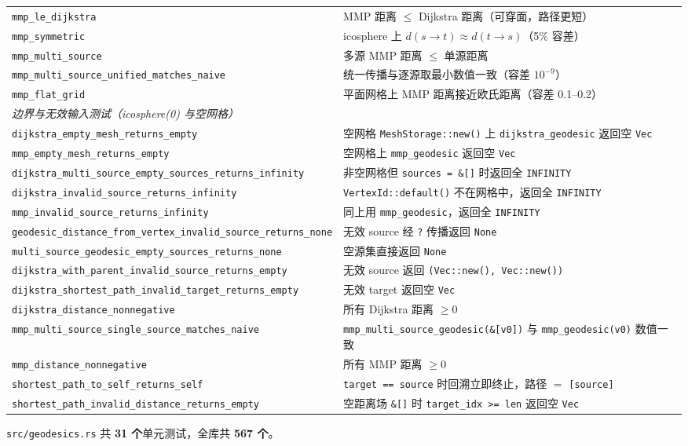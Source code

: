 \documentclass[11pt,a4paper]{article}
\begin{document}
{\begin{longtable}{@{}p{5.6cm}p{9.6cm}@{}}
  \texttt{mmp\_le\_dijkstra}
    & MMP 距离 $\le$ Dijkstra 距离（可穿面，路径更短） \\
  \texttt{mmp\_symmetric}
    & icosphere 上 $d(s \to t) \approx d(t \to s)$（5\% 容差） \\
  \texttt{mmp\_multi\_source}
    & 多源 MMP 距离 $\le$ 单源距离 \\
  \texttt{mmp\_multi\_source\_unified\_matches\_naive}
    & 统一传播与逐源取最小数值一致（容差 $10^{-9}$） \\
  \texttt{mmp\_flat\_grid}
    & 平面网格上 MMP 距离接近欧氏距离（容差 0.1--0.2） \\
  \midrule
  \multicolumn{2}{l}{\textit{边界与无效输入测试（icosphere(0) 与空网格）}} \\
  \texttt{dijkstra\_empty\_mesh\_returns\_empty}
    & 空网格 \texttt{MeshStorage::new()} 上 \texttt{dijkstra\_geodesic} 返回空 \texttt{Vec} \\
  \texttt{mmp\_empty\_mesh\_returns\_empty}
    & 空网格上 \texttt{mmp\_geodesic} 返回空 \texttt{Vec} \\
  \texttt{dijkstra\_multi\_source\_empty\_sources\_returns\_infinity}
    & 非空网格但 \texttt{sources = \&[]} 时返回全 \texttt{INFINITY} \\
  \texttt{dijkstra\_invalid\_source\_returns\_infinity}
    & \texttt{VertexId::default()} 不在网格中，返回全 \texttt{INFINITY} \\
  \texttt{mmp\_invalid\_source\_returns\_infinity}
    & 同上用 \texttt{mmp\_geodesic}，返回全 \texttt{INFINITY} \\
  \texttt{geodesic\_distance\_from\_vertex\_invalid\_source\_returns\_none}
    & 无效 source 经 \texttt{?} 传播返回 \texttt{None} \\
  \texttt{multi\_source\_geodesic\_empty\_sources\_returns\_none}
    & 空源集直接返回 \texttt{None} \\
  \texttt{dijkstra\_with\_parent\_invalid\_source\_returns\_empty}
    & 无效 source 返回 \texttt{(Vec::new(), Vec::new())} \\
  \texttt{dijkstra\_shortest\_path\_invalid\_target\_returns\_empty}
    & 无效 target 返回空 \texttt{Vec} \\
  \texttt{dijkstra\_distance\_nonnegative}
    & 所有 Dijkstra 距离 $\ge 0$ \\
  \texttt{mmp\_multi\_source\_single\_source\_matches\_naive}
    & \texttt{mmp\_multi\_source\_geodesic(\&[v0])} 与 \texttt{mmp\_geodesic(v0)} 数值一致 \\
  \texttt{mmp\_distance\_nonnegative}
    & 所有 MMP 距离 $\ge 0$ \\
  \texttt{shortest\_path\_to\_self\_returns\_self}
    & \texttt{target == source} 时回溯立即终止，路径 $=$ \texttt{[source]} \\
  \texttt{shortest\_path\_invalid\_distance\_returns\_empty}
    & 空距离场 \texttt{\&[]} 时 \texttt{target\_idx >= len} 返回空 \texttt{Vec} \\
\end{longtable}
}

\texttt{src/geodesics.rs} 共 \textbf{31 个}单元测试，全库共 \textbf{567 个}。
\end{document}

